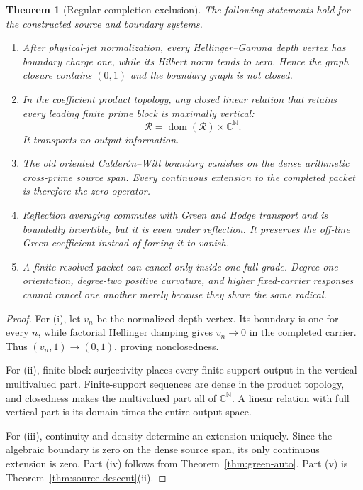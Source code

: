\documentclass[11pt]{article}
\newtheorem{theorem}{Theorem}[section]
\theoremstyle{definition}
\theoremstyle{remark}
\newcommand{\C}{\mathbb C}
\newcommand{\N}{\mathbb N}
\newcommand{\dom}{\operatorname{dom}}
\begin{document}
\begin{theorem}[Regular-completion exclusion]
\label{thm:no-go}
The following statements hold for the constructed source and boundary
systems.
\begin{enumerate}[label=\textup{(\roman*)}]
\item After physical-jet normalization, every Hellinger--Gamma depth vertex
      has boundary charge one, while its Hilbert norm tends to zero.  Hence
      the graph closure contains \((0,1)\) and the boundary graph is not
      closed.
\item In the coefficient product topology, any closed linear relation that
      retains every leading finite prime block is maximally vertical:
      \[
          \mathcal R=\dom(\mathcal R)\times\C^{\N}.
      \tag{7.1}\label{eq:max-vertical}
      \]
      It transports no output information.
\item The old oriented Calder\'on--Witt boundary vanishes on the dense
      arithmetic cross-prime source span.  Every continuous extension to the
      completed packet is therefore the zero operator.
\item Reflection averaging commutes with Green and Hodge transport and is
      boundedly invertible, but it is even under reflection.  It preserves
      the off-line Green coefficient instead of forcing it to vanish.
\item A finite resolved packet can cancel only inside one full grade.
      Degree-one orientation, degree-two positive curvature, and higher
      fixed-carrier responses cannot cancel one another merely because they
      share the same radical.
\end{enumerate}
\end{theorem}

\begin{proof}
For (i), let \(v_n\) be the normalized depth vertex.  Its boundary is one
for every \(n\), while factorial Hellinger damping gives \(v_n\to0\) in the
completed carrier.  Thus \((v_n,1)\to(0,1)\), proving nonclosedness.

For (ii), finite-block surjectivity places every finite-support output in the
vertical multivalued part.  Finite-support sequences are dense in the
product topology, and closedness makes the multivalued part all of
\(\C^\N\).  A linear relation with full vertical part is its domain times the
entire output space.

For (iii), continuity and density determine an extension uniquely.  Since
the algebraic boundary is zero on the dense source span, its only continuous
extension is zero.  Part (iv) follows from
Theorem~\ref{thm:green-auto}.  Part (v) is
Theorem~\ref{thm:source-descent}(ii).
\end{proof}
\end{document}
